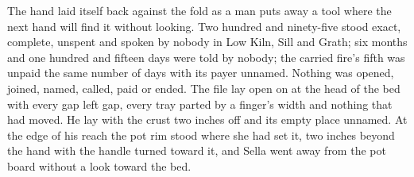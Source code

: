 The hand laid itself back against the fold as a man puts away a tool where the next hand will find it without looking. Two hundred and ninety-five stood exact, complete, unspent and spoken by nobody in Low Kiln, Sill and Grath; six months and one hundred and fifteen days were told by nobody; the carried fire's fifth was unpaid the same number of days with its payer unnamed. Nothing was opened, joined, named, called, paid or ended. The file lay open on  at the head of the bed with every gap left gap, every tray parted by a finger's width and nothing that had moved. He lay with the crust two inches off and its empty place unnamed. At the edge of his reach the pot rim stood where she had set it, two inches beyond the hand with the handle turned toward it, and Sella went away from the pot board without a look toward the bed.
